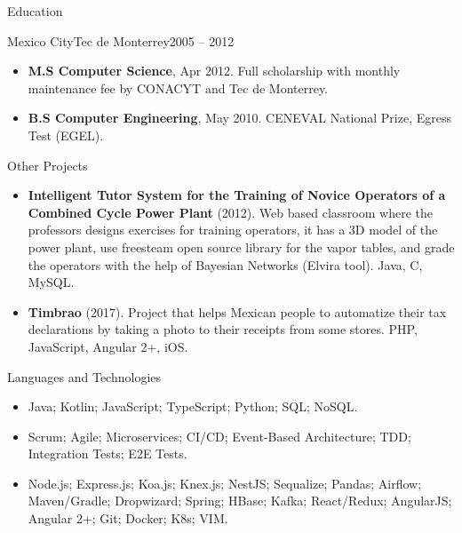 \documentclass[calibri]{../macdowell-cv/mcdowellcv}
\begin{document}
	\begin{cvsection}{Education}
		\begin{cvsubsection}{Mexico City}{Tec de Monterrey}{2005 -- 2012}
			\begin{itemize}
				\item \textbf{M.S Computer Science}, Apr 2012. Full scholarship with monthly maintenance fee by CONACYT and Tec de Monterrey.
				\item \textbf{B.S Computer Engineering}, May 2010. CENEVAL National Prize, Egress Test (EGEL).
			\end{itemize}
		\end{cvsubsection}
	\end{cvsection}
	
	\begin{cvsection}{Other Projects}
		\begin{cvsubsection}{}{}{}	
			\begin{itemize}
				\item \textbf{Intelligent Tutor System for the Training of Novice Operators of a Combined Cycle Power Plant} (2012). Web based classroom where the professors designs exercises for training operators, it has a 3D model of the power plant, use freesteam open source library for the vapor tables, and grade the operators with the help of Bayesian Networks (Elvira tool). Java, C, MySQL.
				\item \textbf{Timbrao} (2017). Project that helps Mexican people to automatize their tax declarations by taking a photo to their receipts from some stores.  PHP, JavaScript, Angular 2+, iOS.
			\end{itemize}
		\end{cvsubsection}
	\end{cvsection}
	
	\begin{cvsection}{Languages and Technologies}
		\begin{cvsubsection}{}{}{}	
			\begin{itemize}
				\item Java; Kotlin; JavaScript; TypeScript; Python; SQL; NoSQL.
				\item Scrum; Agile; Microservices; CI/CD; Event-Based Architecture; TDD; Integration Tests; E2E Tests.
				\item Node.js; Express.js; Koa.js; Knex.js; NestJS; Sequalize; Pandas; Airflow; Maven/Gradle; Dropwizard; Spring; HBase; Kafka; React/Redux; AngularJS; Angular 2+; Git; Docker; K8s; VIM.
			\end{itemize}
		\end{cvsubsection}
	\end{cvsection}
	
\end{document}
